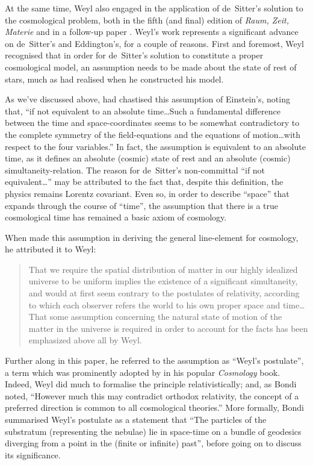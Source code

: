 \documentclass[12 pt]{article}
\begin{document}
At the same time, Weyl also engaged in the application of de~Sitter's solution to the cosmological problem, both in the fifth (and final) edition of \textit{Raum, Zeit, Materie} \citep{Weyl1923a} and in a follow-up paper \citep{Weyl1923b}. Weyl's work represents a significant advance on de~Sitter's and Eddington's, for a couple of reasons. First and foremost, Weyl recognised that in order for de~Sitter's solution to constitute a proper cosmological model, an assumption needs to be made about the state of rest of stars, much as \citet{Einstein1917} had realised when he constructed his model. 
	
As we've discussed above, \citet{deSitter1917a} had chastised this assumption of Einstein's, noting that, ``if not equivalent to an absolute time\ldots Such a fundamental difference between the time and space-coordinates seems to be somewhat contradictory to the complete symmetry of the field-equations and the equations of motion\ldots with respect to the four variables.'' In fact, the assumption is equivalent to an absolute time, as it defines an absolute (cosmic) state of rest and an absolute (cosmic) simultaneity-relation. The reason for de~Sitter's non-committal ``if not equivalent\ldots'' may be attributed to the fact that, despite this definition, the physics remains Lorentz covariant. Even so, in order to describe ``space'' that expands through the course of ``time'', the assumption that there is a true cosmological time has remained a basic axiom of cosmology. 

When \citet{Robertson1933} made this assumption in deriving the general line-element for cosmology, he attributed it to Weyl:
\begin{quote}
That we require the spatial distribution of matter in our highly idealized universe to be uniform implies the existence of a significant simultaneity, and would at first seem contrary to the postulates of relativity, according to which each observer refers the world to his own proper space and time\ldots That some assumption concerning the natural state of motion of the matter in the universe is required in order to account for the facts has been emphasized above all by Weyl.
\end{quote}
Further along in this paper, he referred to the assumption as ``Weyl's postulate'', a term which was prominently adopted by \citet{Bondi1960} in his popular \textit{Cosmology} book. Indeed, Weyl did much to formalise the principle relativistically; and, as Bondi noted, ``However much this may contradict orthodox relativity, the concept of a preferred direction is common to all cosmological theories.'' More formally, Bondi summarised Weyl's postulate as a statement that ``The particles of the substratum (representing the nebulae) lie in space-time on a bundle of geodesics diverging from a point in the (finite or infinite) past'', before going on to discuss its significance.
\end{document}
